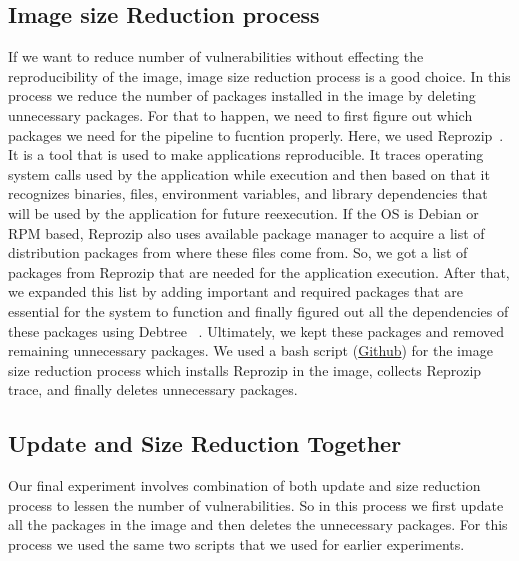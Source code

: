 \documentclass[a4paper,num-refs]{oup-contemporary}
\begin{document}
\subsection{Image size Reduction process}
If we want to reduce number of vulnerabilities without effecting the reproducibility of the image,
image size reduction process is a good choice. In this process we reduce the number of packages
installed in the image by deleting unnecessary packages. For that to happen, we need to first figure
out which packages we need for the pipeline to fucntion properly. Here, we used 
Reprozip~\cite{rampin2016reprozip}. It is a tool that
is used to make applications reproducible. It traces operating system calls used by the
application while execution and then based on that it recognizes binaries, files, environment variables,
and library dependencies that will be used by the application for future reexecution. If the OS is
Debian or RPM based, Reprozip also
uses available package manager to acquire a list of distribution packages from where these files come from.
So, we got a list of packages from Reprozip that are needed for the application execution. 
After that, we expanded this list by adding important and required packages that are essential
for the system to function and finally figured out all the dependencies of these packages using Debtree
~\cite{debtree}.
Ultimately, we kept these packages and removed remaining unnecessary packages. We used a bash script
(\href{https://github.com/kaurbhupinder/Vulnerability-Analysis/blob/master/Scripts/script.sh}{Github}) for
the image size reduction process which installs Reprozip in the image, collects Reprozip trace, and
finally deletes unnecessary packages.

\subsection{Update and Size Reduction Together}

Our final experiment involves combination of both update and size reduction process
to lessen the number of vulnerabilities.
So in this process we first update all the packages in the image and then deletes
the unnecessary packages. For this process we used the same two scripts that
we used for earlier experiments.
\end{document}
